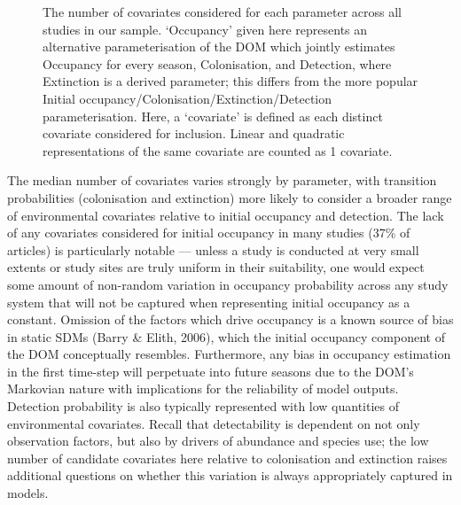 \documentclass[
]{article}
\begin{document}
\begin{figure}


\caption{\label{fig-covariates}The number of covariates considered for
each parameter across all studies in our sample. `Occupancy' given here
represents an alternative parameterisation of the DOM which jointly
estimates Occupancy for every season, Colonisation, and Detection, where
Extinction is a derived parameter; this differs from the more popular
Initial occupancy/Colonisation/Extinction/Detection parameterisation.
Here, a `covariate' is defined as each distinct covariate considered for
inclusion. Linear and quadratic representations of the same covariate
are counted as 1 covariate.}

\end{figure}%

The median number of covariates varies strongly by parameter, with
transition probabilities (colonisation and extinction) more likely to
consider a broader range of environmental covariates relative to initial
occupancy and detection. The lack of any covariates considered for
initial occupancy in many studies (37\% of articles) is particularly
notable --- unless a study is conducted at very small extents or study
sites are truly uniform in their suitability, one would expect some
amount of non-random variation in occupancy probability across any study
system that will not be captured when representing initial occupancy as
a constant. Omission of the factors which drive occupancy is a known
source of bias in static SDMs (Barry \& Elith, 2006), which the initial
occupancy component of the DOM conceptually resembles. Furthermore, any
bias in occupancy estimation in the first time-step will perpetuate into
future seasons due to the DOM's Markovian nature with implications for
the reliability of model outputs. Detection probability is also
typically represented with low quantities of environmental covariates.
Recall that detectability is dependent on not only observation factors,
but also by drivers of abundance and species use; the low number of
candidate covariates here relative to colonisation and extinction raises
additional questions on whether this variation is always appropriately
captured in models.
\end{document}
